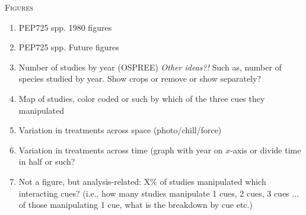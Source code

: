 \documentclass[11pt,letterpaper]{article}
\renewcommand{\section}[1]{%
\bigskip
\begin{center}
\begin{Large}
\normalfont\scshape #1
\medskip
\end{Large}
\end{center}}
\begin{document}

\newpage
\section{Figures}
\begin{enumerate}
\item PEP725 spp. 1980 figures
\item PEP725 spp. Future figures
\item Number of studies by year (OSPREE) \emph{Other ideas?!} Such as, number of species studied by year. Show crops or remove or show separately?
\item Map of studies, color coded or such by which of the three cues they manipulated
\item Variation in treatments across space (photo/chill/force)
\item Variation in treatments across time (graph with year on $x$-axis or divide time in half or such? 
\item Not a figure, but analysis-related: X\% of studies manipulated which interacting cues? (i.e., how many studies manipulate 1 cues, 2 cues, 3 cues ... of those manipulating 1 cue, what is the breakdown by cue etc.)
\end{enumerate}





\end{document}
